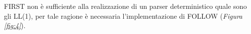 \documentclass{subfiles}
\begin{document}
FIRST non è sufficiente alla realizzazione di un parser deterministico quale sono gli LL(1),
per tale ragione è necessaria l'implementazione di FOLLOW (\emph{Figura \ref{fig:4}}).

\end{document}
